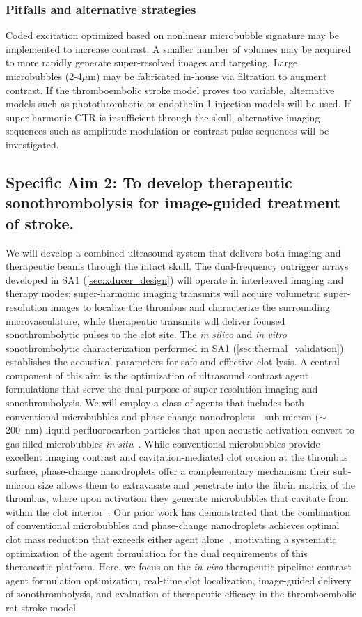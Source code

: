\subsubsection{Pitfalls and alternative strategies} 
Coded excitation optimized based on nonlinear microbubble signature may be implemented to increase contrast. A smaller number of volumes may be acquired to more rapidly generate super-resolved images and targeting. Large microbubbles (2-4$\mu$m) may be fabricated in-house via filtration to augment contrast. If the thromboembolic stroke model proves too variable, alternative models such as photothrombotic or endothelin-1 injection models will be used. If super-harmonic CTR is insufficient through the skull, alternative imaging sequences such as amplitude modulation or contrast pulse sequences will be investigated.

\subsection{Specific Aim 2: To develop therapeutic sonothrombolysis for image-guided treatment of stroke.}
We will develop a combined ultrasound system that delivers both imaging and therapeutic beams through the intact skull. The dual-frequency outrigger arrays developed in SA1 (\ref{sec:xducer_design}) will operate in interleaved imaging and therapy modes: super-harmonic imaging transmits will acquire volumetric super-resolution images to localize the thrombus and characterize the surrounding microvasculature, while therapeutic transmits will deliver focused sonothrombolytic pulses to the clot site. The \textit{in silico} and \textit{in vitro} sonothrombolytic characterization performed in SA1 (\ref{sec:thermal_validation}) establishes the acoustical parameters for safe and effective clot lysis. A central component of this aim is the optimization of ultrasound contrast agent formulations that serve the dual purpose of super-resolution imaging and sonothrombolysis. We will employ a class of agents that includes both conventional microbubbles and phase-change nanodroplets---sub-micron ($\sim$200~nm) liquid perfluorocarbon particles that upon acoustic activation convert to gas-filled microbubbles \textit{in situ}~\cite{bautista2023current}. While conventional microbubbles provide excellent imaging contrast and cavitation-mediated clot erosion at the thrombus surface, phase-change nanodroplets offer a complementary mechanism: their sub-micron size allows them to extravasate and penetrate into the fibrin matrix of the thrombus, where upon activation they generate microbubbles that cavitate from within the clot interior~\cite{kim2020comparison,goel2021nanodroplet}. Our prior work has demonstrated that the combination of conventional microbubbles and phase-change nanodroplets achieves optimal clot mass reduction that exceeds either agent alone~\cite{kim2022analysis}, motivating a systematic optimization of the agent formulation for the dual requirements of this theranostic platform. Here, we focus on the \textit{in vivo} therapeutic pipeline: contrast agent formulation optimization, real-time clot localization, image-guided delivery of sonothrombolysis, and evaluation of therapeutic efficacy in the thromboembolic rat stroke model.

